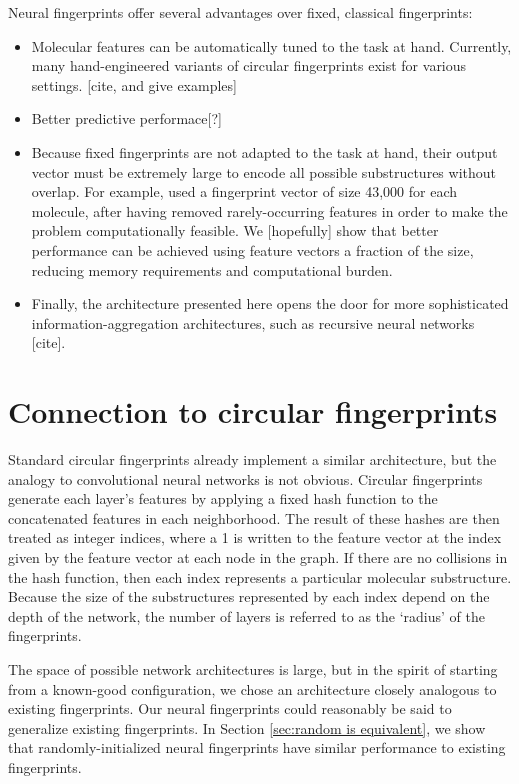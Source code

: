 \documentclass{article}
\begin{document}
Neural fingerprints offer several advantages over fixed, classical fingerprints:
\begin{itemize}
\item Molecular features can be automatically tuned to the task at hand.
Currently, many hand-engineered variants of circular fingerprints exist for various settings. [cite, and give examples]
\item Better predictive performace[?]
\item Because fixed fingerprints are not adapted to the task at hand, their output vector must be extremely large to encode all possible substructures without overlap.
For example, \cite{unterthinerdeep} used a fingerprint vector of size 43,000 for each molecule, after having removed rarely-occurring features in order to make the problem computationally feasible.
We [hopefully] show that better performance can be achieved using feature vectors a fraction of the size, reducing memory requirements and computational burden.
\item Finally, the architecture presented here opens the door for more sophisticated information-aggregation architectures, such as recursive neural networks [cite].
\end{itemize}


\section{Connection to circular fingerprints}


Standard circular fingerprints already implement a similar architecture, but the analogy to convolutional neural networks is not obvious.
Circular fingerprints generate each layer's features by applying a fixed hash function to the concatenated features in each neighborhood.
The result of these hashes are then treated as integer indices, where a 1 is written to the feature vector at the index given by the feature vector at each node in the graph.
If there are no collisions in the hash function, then each index represents a particular molecular substructure.
Because the size of the substructures represented by each index depend on the depth of the network, the number of layers is referred to as the `radius' of the fingerprints.

The space of possible network architectures is large, but in the spirit of starting from a known-good configuration, we chose an architecture closely analogous to existing fingerprints.
Our neural fingerprints could reasonably be said to generalize existing fingerprints.
In Section \ref{sec:random is equivalent}, we show that randomly-initialized neural fingerprints have similar performance to existing fingerprints.
\end{document}
